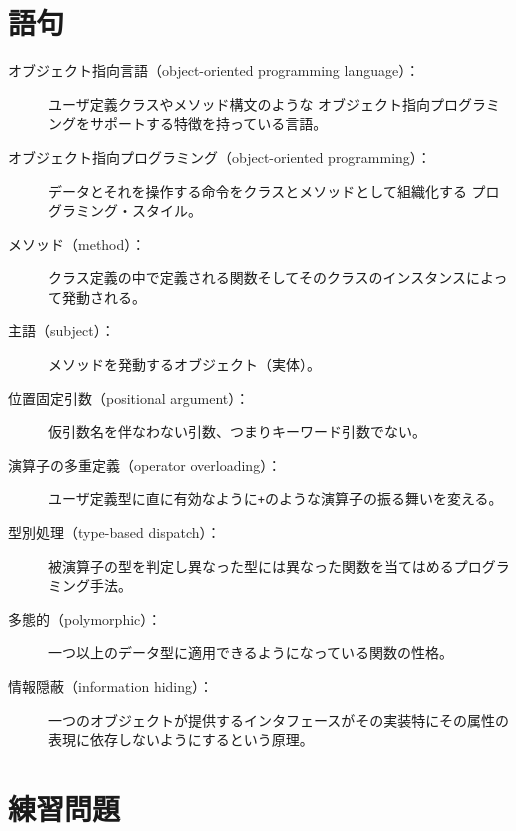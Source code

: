 \documentclass[a4j,12pt,makeidx]{jbook}
\begin{document}
\section{語句}
\begin{description}

\item[オブジェクト指向言語（object-oriented programming language）：] ユーザ定義クラスやメソッド構文のような
オブジェクト指向プログラミングをサポートする特徴を持っている言語。

\item[オブジェクト指向プログラミング（object-oriented programming）：] データとそれを操作する命令をクラスとメソッドとして組織化する
プログラミング・スタイル。

\item[メソッド（method）：] クラス定義の中で定義される関数そしてそのクラスのインスタンスによって発動される。

\item[主語（subject）：] メソッドを発動するオブジェクト（実体）。

\item[位置固定引数（positional argument）：] 仮引数名を伴なわない引数、つまりキーワード引数でない。

\item[演算子の多重定義（operator overloading）：] ユーザ定義型に直に有効なように{\tt +}のような演算子の振る舞いを変える。

\item[型別処理（type-based dispatch）：] 被演算子の型を判定し異なった型には異なった関数を当てはめるプログラミング手法。

\item[多態的（polymorphic）：] 一つ以上のデータ型に適用できるようになっている関数の性格。  

\item[情報隠蔽（information hiding）：] 一つのオブジェクトが提供するインタフェースがその実装特にその属性の表現に依存しないようにするという原理。

\end{description}
%
\section{練習問題}
\end{document}
